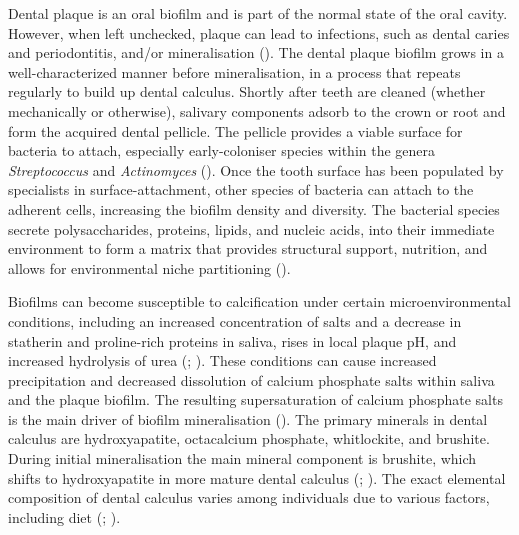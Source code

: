 \documentclass[
  b5paper,
]{book}
\begin{document}
Dental plaque is an oral biofilm and is part of the normal state of the
oral cavity. However, when left unchecked, plaque can lead to
infections, such as dental caries and periodontitis, and/or
mineralisation (). The
dental plaque biofilm grows in a well-characterized manner before
mineralisation, in a process that repeats regularly to build up dental
calculus. Shortly after teeth are cleaned (whether mechanically or
otherwise), salivary components adsorb to the crown or root and form the
acquired dental pellicle. The pellicle provides a viable surface for
bacteria to attach, especially early-coloniser species within the genera
\emph{Streptococcus} and \emph{Actinomyces}
(). Once the tooth
surface has been populated by specialists in surface-attachment, other
species of bacteria can attach to the adherent cells, increasing the
biofilm density and diversity. The bacterial species secrete
polysaccharides, proteins, lipids, and nucleic acids, into their
immediate environment to form a matrix that provides structural support,
nutrition, and allows for environmental niche partitioning
().

Biofilms can become susceptible to calcification under certain
microenvironmental conditions, including an increased concentration of
salts and a decrease in statherin and proline-rich proteins in saliva,
rises in local plaque pH, and increased hydrolysis of urea
(;
). These
conditions can cause increased precipitation and decreased dissolution
of calcium phosphate salts within saliva and the plaque biofilm. The
resulting supersaturation of calcium phosphate salts is the main driver
of biofilm mineralisation
(). The
primary minerals in dental calculus are hydroxyapatite, octacalcium
phosphate, whitlockite, and brushite. During initial mineralisation the
main mineral component is brushite, which shifts to hydroxyapatite in
more mature dental calculus
(;
). The
exact elemental composition of dental calculus varies among individuals
due to various factors, including diet
(;
).
\end{document}

